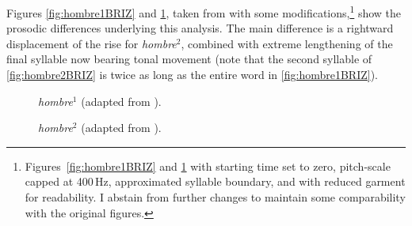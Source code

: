 Figures \ref{fig:hombre1BRIZ} and \ref{fig:hombre2BRIZ}, taken from \citet{Briz.2012} with some modifications,\footnote{Figures~\ref{fig:hombre1BRIZ} and \ref{fig:hombre2BRIZ} with starting time set to zero, pitch-scale capped at 400\,Hz, approximated syllable boundary, and with reduced garment for readability. I abstain from further changes to maintain some comparability with the original figures.} show the prosodic differences underlying this analysis. The main difference is a rightward displacement of the rise for \textit{hombre}$^2$, combined with extreme lengthening of the final syllable now bearing tonal movement (note that the second syllable of \autoref{fig:hombre2BRIZ} is twice as long as the entire word in \autoref{fig:hombre1BRIZ}).

\begin{figure}
\begin{floatrow}
	\captionsetup{margin=.05\linewidth}%
	{\caption[Falling intonation on \textit{hombre}]{\textit{hombre}$^1$ (adapted from \cite[33]{Briz.2012}).  \href{http://www.dpde.es/\#/entry/hombre1}{\faExternalLink*}\label{fig:hombre1BRIZ}}}
	{\caption[L* HL\% on \textit{hombre}]{\textit{hombre}$^2$ (adapted from \cite[39]{Briz.2012}). \href{http://www.dpde.es/\#/entry/hombre2}{\faExternalLink*}\label{fig:hombre2BRIZ}}}
\end{floatrow}
\end{figure}

